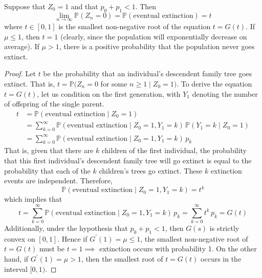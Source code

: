     \begin{theorem}
      \label{thm:extinction-probability-as-a-fixed-point}
      Suppose that $Z_0 = 1$ and that $p_0 + p_1 < 1$. Then
      \begin{equation}
        \lim_{n \rightarrow \infty} \mathbb{P}(Z_n = 0) = \mathbb{P}(\text{eventual extinction}) = t
      \end{equation}
      where $t \in [0, 1]$ is the smallest non-negative root of the equation $t = G(t)$. If $\mu \leq 1$, then $t = 1$ (clearly, since the population will exponentially decrease on average). If $\mu > 1$, there is a positive probability that the population never goes extinct. 
    \end{theorem}
    \begin{proof}
      Let $t$ be the probability that an individual's descendent family tree goes extinct. That is, $t = \mathbb{P}(Z_n = 0$ for some $n \geq 1 \; | \; Z_0 = 1)$. To derive the equation $t = G(t)$, let us condition on the first generation, with $Y_1$ denoting the number of offspring of the single parent. 
      \begin{align*}
        t & = \mathbb{P}(\text{eventual extinction} \; | \; Z_0 = 1) \\
        & = \sum_{k=0}^\infty \mathbb{P}(\text{eventual extinction} \; | \; Z_0 = 1, Y_1 = k) \, \mathbb{P}(Y_1 = k \; | \; Z_0 = 1) \\
        & = \sum_{k=0}^\infty \mathbb{P}(\text{eventual extinction} \; | \;Z_0 =1, Y_1 = k) \, p_k
      \end{align*}
      That is, given that there are $k$ children of the first individual, the probability that this first individual's descendent family tree will go extinct is equal to the probability that each of the $k$ children's trees go extinct. These $k$ extinction events are independent. Therefore, 
      \begin{equation}
        \mathbb{P}(\text{eventual extinction} \; | \;Z_0 = 1, Y_1 = k) = t^k
      \end{equation}
      which implies that 
      \begin{equation}
        t = \sum_{k=0}^\infty \mathbb{P}(\text{eventual extinction} \; | \; Z_0 = 1, Y_1 = k) \, p_k = \sum_{k=0}^\infty t^k \, p_k = G(t)
      \end{equation}
      Additionally, under the hypothesis that $p_0 + p_1 < 1$, then $G(s)$ is strictly convex on $[0,1]$. Hence if $G^\prime (1) = \mu \leq 1$, the smallest non-negative root of $t = G(t)$ must be $t=1 \implies$ extinction occurs with probability 1. On the other hand, if $G^\prime (1) = \mu > 1$, then the smallest root of $t = G(t)$ occurs in the interval $[0,1)$. 
    \end{proof}

